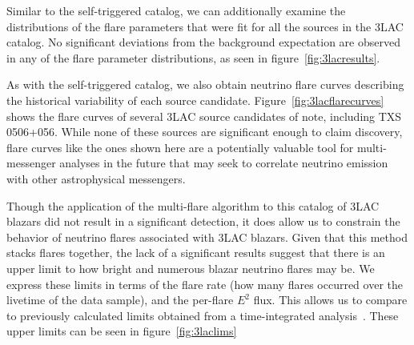 Similar to the self-triggered catalog, we can additionally examine the distributions of the flare parameters that were fit for all the sources in the 3LAC catalog. No significant deviations from the background expectation are observed in any of the flare parameter distributions, as seen in figure~\ref{fig:3lacresults}.

As with the self-triggered catalog, we also obtain neutrino flare curves describing the historical variability of each source candidate. Figure~\ref{fig:3lacflarecurves} shows the flare curves of several 3LAC source candidates of note, including TXS 0506+056. While none of these sources are significant enough to claim discovery, flare curves like the ones shown here are a potentially valuable tool for multi-messenger analyses in the future that may seek to correlate neutrino emission with other astrophysical messengers. 

Though the application of the multi-flare algorithm to this catalog of 3LAC blazars did not result in a significant detection, it does allow us to constrain the behavior of neutrino flares associated with 3LAC blazars. Given that this method stacks flares together, the lack of a significant results suggest that there is an upper limit to how bright and numerous blazar neutrino flares may be. We express these limits in terms of the flare rate (how many flares occurred over the livetime of the data sample), and the per-flare $E^2$ flux. This allows us to compare to previously calculated limits obtained from a time-integrated analysis~\cite{2lac_ic}. These upper limits can be seen in figure~\ref{fig:3laclims}

